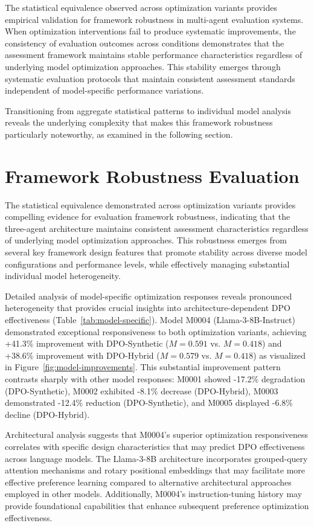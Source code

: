 The statistical equivalence observed across optimization variants provides empirical validation for framework robustness in multi-agent evaluation systems. When optimization interventions fail to produce systematic improvements, the consistency of evaluation outcomes across conditions demonstrates that the assessment framework maintains stable performance characteristics regardless of underlying model optimization approaches. This stability emerges through systematic evaluation protocols that maintain consistent assessment standards independent of model-specific performance variations.

Transitioning from aggregate statistical patterns to individual model analysis reveals the underlying complexity that makes this framework robustness particularly noteworthy, as examined in the following section.

\section{Framework Robustness Evaluation}
\label{sec:framework-robustness}

The statistical equivalence demonstrated across optimization variants provides compelling evidence for evaluation framework robustness, indicating that the three-agent architecture maintains consistent assessment characteristics regardless of underlying model optimization approaches. This robustness emerges from several key framework design features that promote stability across diverse model configurations and performance levels, while effectively managing substantial individual model heterogeneity.

Detailed analysis of model-specific optimization responses reveals pronounced heterogeneity that provides crucial insights into architecture-dependent DPO effectiveness (Table~\ref{tab:model-specific}). Model M0004 (Llama-3-8B-Instruct) demonstrated exceptional responsiveness to both optimization variants, achieving +41.3\% improvement with DPO-Synthetic ($M = 0.591$ vs. $M = 0.418$) and +38.6\% improvement with DPO-Hybrid ($M = 0.579$ vs. $M = 0.418$) as visualized in Figure~\ref{fig:model-improvements}. This substantial improvement pattern contrasts sharply with other model responses: M0001 showed -17.2\% degradation (DPO-Synthetic), M0002 exhibited -8.1\% decrease (DPO-Hybrid), M0003 demonstrated -12.4\% reduction (DPO-Synthetic), and M0005 displayed -6.8\% decline (DPO-Hybrid).

Architectural analysis suggests that M0004's superior optimization responsiveness correlates with specific design characteristics that may predict DPO effectiveness across language models. The Llama-3-8B architecture incorporates grouped-query attention mechanisms and rotary positional embeddings that may facilitate more effective preference learning compared to alternative architectural approaches employed in other models. Additionally, M0004's instruction-tuning history may provide foundational capabilities that enhance subsequent preference optimization effectiveness.

